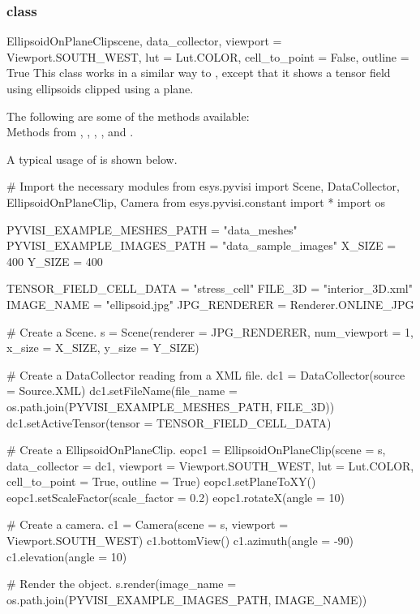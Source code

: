 \subsubsection{\EllipsoidOnPlaneClip class}

\begin{classdesc}{EllipsoidOnPlaneClip}{scene, data_collector,
viewport = Viewport.SOUTH_WEST, lut = Lut.COLOR, cell_to_point = False, 
outline = True}
This class works in a similar way to \MapOnPlaneClip, except that it shows a 
tensor field using ellipsoids clipped using a plane.
\end{classdesc}
        
The following are some of the methods available:\\
Methods from \ActorThreeD, \Sphere, \TensorGlyph, \Transform, \Clipper 
and \MaskPoints.

A typical usage of \EllipsoidOnPlaneClip is shown below.

\begin{python}
# Import the necessary modules
from esys.pyvisi import Scene, DataCollector, EllipsoidOnPlaneClip, Camera
from esys.pyvisi.constant import *
import os

PYVISI_EXAMPLE_MESHES_PATH = "data_meshes"
PYVISI_EXAMPLE_IMAGES_PATH = "data_sample_images"
X_SIZE = 400
Y_SIZE = 400

TENSOR_FIELD_CELL_DATA = "stress_cell"
FILE_3D = "interior_3D.xml"
IMAGE_NAME = "ellipsoid.jpg"
JPG_RENDERER = Renderer.ONLINE_JPG

# Create a Scene.
s = Scene(renderer = JPG_RENDERER, num_viewport = 1, x_size = X_SIZE, 
        y_size = Y_SIZE)

# Create a DataCollector reading from a XML file.
dc1 = DataCollector(source = Source.XML)
dc1.setFileName(file_name = os.path.join(PYVISI_EXAMPLE_MESHES_PATH, FILE_3D))
dc1.setActiveTensor(tensor = TENSOR_FIELD_CELL_DATA)

# Create a EllipsoidOnPlaneClip.
eopc1 = EllipsoidOnPlaneClip(scene = s, data_collector = dc1, 
        viewport = Viewport.SOUTH_WEST, lut = Lut.COLOR, cell_to_point = True, 
        outline = True)
eopc1.setPlaneToXY()
eopc1.setScaleFactor(scale_factor = 0.2)
eopc1.rotateX(angle = 10)

# Create a camera.
c1 = Camera(scene = s, viewport = Viewport.SOUTH_WEST)
c1.bottomView()
c1.azimuth(angle = -90)
c1.elevation(angle = 10)

# Render the object.
s.render(image_name = os.path.join(PYVISI_EXAMPLE_IMAGES_PATH, IMAGE_NAME))
\end{python}

